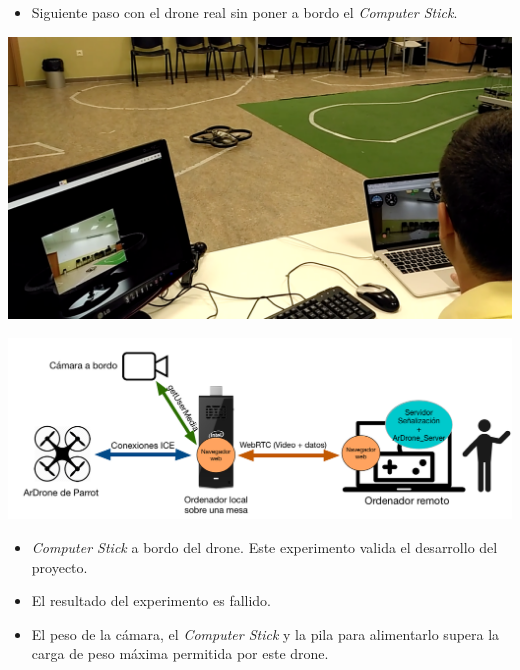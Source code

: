 \documentclass[notes,slidesec,a4]{seminar}
\begin{document}

\begin{hslide}
\begin{itemize}
\item Siguiente paso con el drone real sin poner a bordo el \emph{Computer Stick}.
\end{itemize}

\begin{minipage}[t]{0.3\textwidth}
\includegraphics[width=\textwidth]{img/experimentodronereal1}
\end{minipage}
\begin{minipage}[t]{0.7\textwidth}
\includegraphics[width=\textwidth]{img/esquema_experimento2}
\end{minipage}

\end{hslide}


\begin{hslide}
\begin{itemize}
\item \emph{Computer Stick} a bordo del drone. Este experimento valida el desarrollo del proyecto.
\item El resultado del experimento es fallido.
\item El peso de la cámara, el \emph{Computer Stick} y la pila para alimentarlo supera la carga de peso máxima permitida por este drone.
\end{itemize}
\end{hslide}
\end{document}
